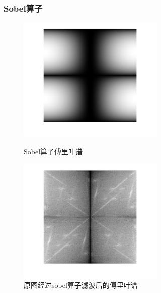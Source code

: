 \documentclass[11pt, a4paper, UTF8]{ctexart}
\begin{document}
 \subsubsection{Sobel算子}
  \begin{figure}[H]
    \centering
    \begin{minipage}[t]{0.48\textwidth}
    \centering
    \includegraphics[width=7cm]{sobel.jpg}
    \caption{Sobel算子傅里叶谱}
    \end{minipage}
    \begin{minipage}[t]{0.48\textwidth}
    \centering
    \includegraphics[width=7cm]{sobel_filter.jpg}
    \caption{原图经过sobel算子滤波后的傅里叶谱}
    \end{minipage}
  \end{figure}
\end{document}
